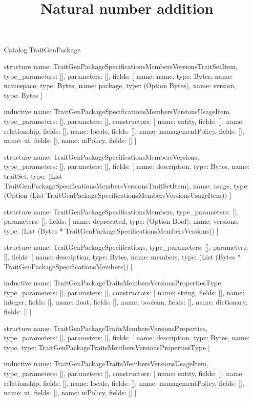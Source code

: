 \begin{lexlean}{Catalog.TraitGenPackage}
\title{Natural number addition}
\begin{semanticmodule}
structure{
  name: TraitGenPackageSpecificationsMembersVersionsTraitSetItem,
  type_parameters: [],
  parameters: [],
  fields: [
    {name: name, type: Bytes},
    {name: namespace, type: Bytes},
    {name: package, type: (Option Bytes)},
    {name: version, type: Bytes}
  ]
}

inductive{
  name: TraitGenPackageSpecificationsMembersVersionsUsageItem,
  type_parameters: [],
  parameters: [],
  constructors: [
    {name: entity, fields: []},
    {name: relationship, fields: []},
    {name: locale, fields: []},
    {name: managementPolicy, fields: []},
    {name: ui, fields: []},
    {name: uiPolicy, fields: []}
  ]
}

structure{
  name: TraitGenPackageSpecificationsMembersVersions,
  type_parameters: [],
  parameters: [],
  fields: [
    {name: description, type: Bytes},
    {name: traitSet, type: (List TraitGenPackageSpecificationsMembersVersionsTraitSetItem)},
    {name: usage, type: (Option (List TraitGenPackageSpecificationsMembersVersionsUsageItem))}
  ]
}

structure{
  name: TraitGenPackageSpecificationsMembers,
  type_parameters: [],
  parameters: [],
  fields: [
    {name: deprecated, type: (Option Bool)},
    {name: versions, type: (List (Bytes * TraitGenPackageSpecificationsMembersVersions))}
  ]
}

structure{
  name: TraitGenPackageSpecifications,
  type_parameters: [],
  parameters: [],
  fields: [
    {name: description, type: Bytes},
    {name: members, type: (List (Bytes * TraitGenPackageSpecificationsMembers))}
  ]
}

inductive{
  name: TraitGenPackageTraitsMembersVersionsPropertiesType,
  type_parameters: [],
  parameters: [],
  constructors: [
    {name: string, fields: []},
    {name: integer, fields: []},
    {name: float, fields: []},
    {name: boolean, fields: []},
    {name: dictionary, fields: []}
  ]
}

structure{
  name: TraitGenPackageTraitsMembersVersionsProperties,
  type_parameters: [],
  parameters: [],
  fields: [
    {name: description, type: Bytes},
    {name: type, type: TraitGenPackageTraitsMembersVersionsPropertiesType}
  ]
}

inductive{
  name: TraitGenPackageTraitsMembersVersionsUsageItem,
  type_parameters: [],
  parameters: [],
  constructors: [
    {name: entity, fields: []},
    {name: relationship, fields: []},
    {name: locale, fields: []},
    {name: managementPolicy, fields: []},
    {name: ui, fields: []},
    {name: uiPolicy, fields: []}
  ]
}


\end{semanticmodule}
\end{lexlean}
